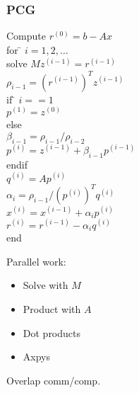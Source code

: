 \documentclass{beamer}
\begin{document}
\begin{frame}[fragile]
  \frametitle{PCG}

\begin{minipage}{0.6\textwidth}
\begin{tabbing}
Compute $r^{(0)} = b - Ax$ \\
for \= $i = 1, 2, \ldots$ \\
\> solve $Mz^{(i-1)} = r^{(i-1)}$ \\
\> $\rho_{i-1} = (r^{(i-1)})^T z^{(i-1)}$ \\
\> if \= $i == 1$ \\
\> \> $p^{(1)} = z^{(0)}$ \\
\> else \\
\> \> $\beta_{i-1} = \rho_{i-1}/\rho_{i-2}$ \\
\> \> $p^{(i)} = z^{(i-1)} + \beta_{i-1} p^{(i-1)}$ \\
\> endif \\
\> $q^{(i)} = A p^{(i)}$ \\
\> $\alpha_i = \rho_{i-1} / (p^{(i)})^T q^{(i)}$ \\
\> $x^{(i)} = x^{(i-1)} + \alpha_i p^{(i)}$ \\
\> $r^{(i)} = r^{(i-1)} - \alpha_i q^{(i)}$ \\
end
\end{tabbing}
\end{minipage}
\begin{minipage}{0.35\textwidth}
  Parallel work:
  \begin{itemize}
    \item Solve with $M$
    \item Product with $A$
    \item Dot products
    \item Axpys
  \end{itemize}
  Overlap comm/comp.
\end{minipage}

\end{frame}
\end{document}

